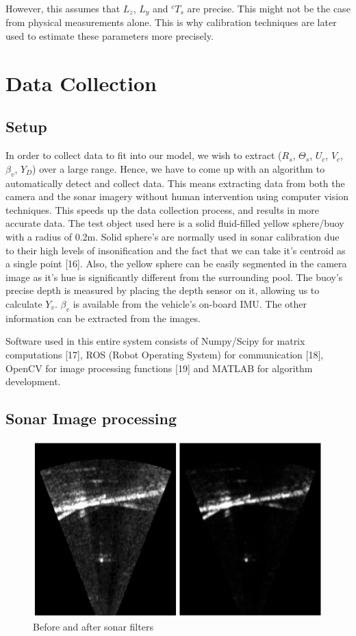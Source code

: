 \documentclass[a4paper]{IEEEtran}
\let\Theta\varTheta
\newcommand{\RSonar}{$\si{\textit{R}_{s}}$\xspace}
\newcommand{\ThetaSonar}{$\si{\Theta_{s}}$\xspace}
\newcommand{\UCamera}{$\si{\textit{U}_{c}}$\xspace}
\newcommand{\VCamera}{$\si{\textit{V}_{c}}$\xspace}
\newcommand{\YDepth}{$Y_{D}$\xspace}
\newcommand{\YVehicle}{$\si{\textit{Y}_{v}}$\xspace}
\newcommand{\PitchVehicle}{${\beta_{v}}$\xspace}
\begin{document}
However, this assumes that $L_{z}$, $L_{y}$ and $^{c}T_{s}$ are precise. This might not be the case from physical measurements alone. This is why calibration techniques are later used to estimate these parameters more precisely.

\section{Data Collection}

\subsection{Setup}

In order to collect data to fit into our model, we wish to extract (\RSonar, \ThetaSonar, \UCamera, \VCamera, \PitchVehicle, \YDepth) over a large range. Hence, we have to come up with an algorithm to automatically detect and collect data. This means extracting data from both the camera and the sonar imagery without human intervention using computer vision techniques. This speeds up the data collection process, and results in more accurate data. The test object used here is a solid fluid-filled yellow sphere/buoy with a radius of 0.2m. Solid sphere's are normally used in sonar calibration due to their high levels of insonification and the fact that we can take it's centroid as a single point [16]. Also, the yellow sphere can be easily segmented in the camera image as it's hue is significantly different from the surrounding pool. The buoy's precise depth is measured by placing the depth sensor on it, allowing us to calculate \YVehicle. \PitchVehicle is available from the vehicle's on-board IMU. The other information can be extracted from the images.  

Software used in this entire system consists of Numpy/Scipy for matrix computations [17], ROS (Robot Operating System) for communication [18], OpenCV for image processing functions [19] and MATLAB for algorithm development.

\subsection{Sonar Image processing}

\begin{figure}[h!]
  \centering
  \includegraphics[scale=0.4]{sonarprocessed}
  \captionsetup{justification=centering}
  \caption{Before and after sonar filters}
\end{figure}
\end{document}
